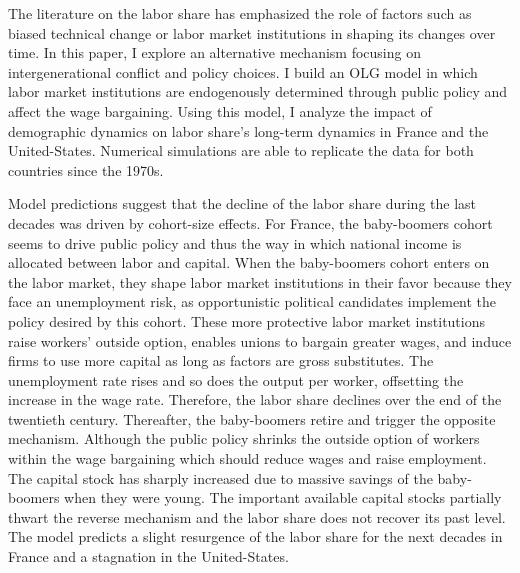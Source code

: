 The literature on the labor share has emphasized the role of factors such as biased technical change or labor market institutions in shaping its changes over time. 
In this paper, I explore an alternative mechanism focusing on intergenerational conflict and policy choices. 
I build an OLG model in which labor market institutions are endogenously determined through public policy and affect the wage bargaining. 
Using this model, I analyze the impact of demographic dynamics on labor share's long-term dynamics in France and the United-States. 
Numerical simulations are able to replicate the data for both countries since the 1970s.


Model predictions suggest that the decline of the labor share during the last decades was driven by cohort-size effects. 
For France, the baby-boomers cohort seems to drive public policy and thus the way in which national income is allocated between labor and capital.
When the baby-boomers cohort enters on the labor market, they shape labor market institutions in their favor because they face an unemployment risk, as opportunistic political candidates implement the policy desired by this cohort. 
These more protective labor market institutions raise workers' outside option, enables unions to bargain greater wages, and induce firms to use more capital as long as factors are gross substitutes.
The unemployment rate rises and so does the output per worker, offsetting the increase in the wage rate. 
Therefore, the labor share declines over the end of the twentieth century. 
Thereafter, the baby-boomers retire and trigger the opposite mechanism. 
Although the public policy shrinks the outside option of workers within the wage bargaining which should reduce wages and raise employment. 
The capital stock has sharply increased due to massive savings of the baby-boomers when they were young. 
The important available capital stocks partially thwart the reverse mechanism and the labor share does not recover its past level.
The model predicts a slight resurgence of the labor share for the next decades in France and a stagnation in the United-States.

